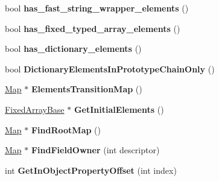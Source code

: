 \begin{DoxyCompactItemize}
\item 
bool {\bfseries has\+\_\+fast\+\_\+string\+\_\+wrapper\+\_\+elements} ()\hypertarget{classv8_1_1internal_1_1_map_ae314abe531de0e537fb8ff79ce03993f}{}\label{classv8_1_1internal_1_1_map_ae314abe531de0e537fb8ff79ce03993f}

\item 
bool {\bfseries has\+\_\+fixed\+\_\+typed\+\_\+array\+\_\+elements} ()\hypertarget{classv8_1_1internal_1_1_map_a75abe0c0df4ee0e1c1a36e5021e1e8e6}{}\label{classv8_1_1internal_1_1_map_a75abe0c0df4ee0e1c1a36e5021e1e8e6}

\item 
bool {\bfseries has\+\_\+dictionary\+\_\+elements} ()\hypertarget{classv8_1_1internal_1_1_map_a4e365f3328d1b293a4740a50664d2e97}{}\label{classv8_1_1internal_1_1_map_a4e365f3328d1b293a4740a50664d2e97}

\item 
bool {\bfseries Dictionary\+Elements\+In\+Prototype\+Chain\+Only} ()\hypertarget{classv8_1_1internal_1_1_map_ae66155e036a9380fcf567bf79b3abfce}{}\label{classv8_1_1internal_1_1_map_ae66155e036a9380fcf567bf79b3abfce}

\item 
\hyperlink{classv8_1_1internal_1_1_map}{Map} $\ast$ {\bfseries Elements\+Transition\+Map} ()\hypertarget{classv8_1_1internal_1_1_map_aa4480e99adbf3e195fb3c558520a2409}{}\label{classv8_1_1internal_1_1_map_aa4480e99adbf3e195fb3c558520a2409}

\item 
\hyperlink{classv8_1_1internal_1_1_fixed_array_base}{Fixed\+Array\+Base} $\ast$ {\bfseries Get\+Initial\+Elements} ()\hypertarget{classv8_1_1internal_1_1_map_a9db82c1c9a9a68745acc5adac4b69ca1}{}\label{classv8_1_1internal_1_1_map_a9db82c1c9a9a68745acc5adac4b69ca1}

\item 
\hyperlink{classv8_1_1internal_1_1_map}{Map} $\ast$ {\bfseries Find\+Root\+Map} ()\hypertarget{classv8_1_1internal_1_1_map_aa6e0e5a0ad270fbf6c73b408ed7f2ddb}{}\label{classv8_1_1internal_1_1_map_aa6e0e5a0ad270fbf6c73b408ed7f2ddb}

\item 
\hyperlink{classv8_1_1internal_1_1_map}{Map} $\ast$ {\bfseries Find\+Field\+Owner} (int descriptor)\hypertarget{classv8_1_1internal_1_1_map_ad79ec56ac28debea19950087ffc0fa6e}{}\label{classv8_1_1internal_1_1_map_ad79ec56ac28debea19950087ffc0fa6e}

\item 
int {\bfseries Get\+In\+Object\+Property\+Offset} (int index)\hypertarget{classv8_1_1internal_1_1_map_ab5e495c4ab1986123f55529bf8794440}{}\label{classv8_1_1internal_1_1_map_ab5e495c4ab1986123f55529bf8794440}


\end{DoxyCompactItemize}
